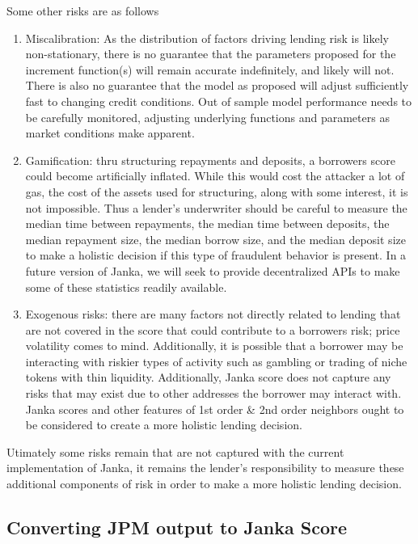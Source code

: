 \documentclass{article}
\begin{document}
Some other risks are as follows

\begin{enumerate}
    \item Miscalibration: As the distribution of factors driving lending risk is likely non-stationary, there is no guarantee that the parameters proposed for the increment function(s) will remain accurate indefinitely, and likely will not. There is also no guarantee that the model as proposed will adjust sufficiently fast to changing credit conditions. Out of sample model performance needs to be carefully monitored, adjusting underlying functions and parameters as market conditions make apparent. 
    \item Gamification: thru structuring repayments and deposits, a borrowers score could become artificially inflated. While this would cost the attacker a lot of gas, the cost of the assets used for structuring, along with some interest, it is not impossible. Thus a lender's underwriter should be careful to measure the median time between repayments, the median time between deposits, the median repayment size, the median borrow size, and the median deposit size to make a holistic decision if this type of fraudulent behavior is present. In a future version of Janka, we will seek to provide decentralized APIs to make some of these statistics readily available.
    \item Exogenous risks: there are many factors not directly related to lending that are not covered in the score that could contribute to a borrowers risk; price volatility comes to mind. Additionally, it is possible that a borrower may be interacting with riskier types of activity such as gambling or trading of niche tokens with thin liquidity. Additionally, Janka score does not capture any risks that may exist due to other addresses the borrower may interact with. Janka scores and other features of 1st order \& 2nd order neighbors ought to be considered to create a more holistic lending decision.
\end{enumerate}

Utimately some risks remain that are not captured with the current implementation of Janka, it remains the lender's responsibility to measure these additional components of risk in order to make a more holistic lending decision.

\subsection{Converting JPM output to Janka Score}
\end{document}
